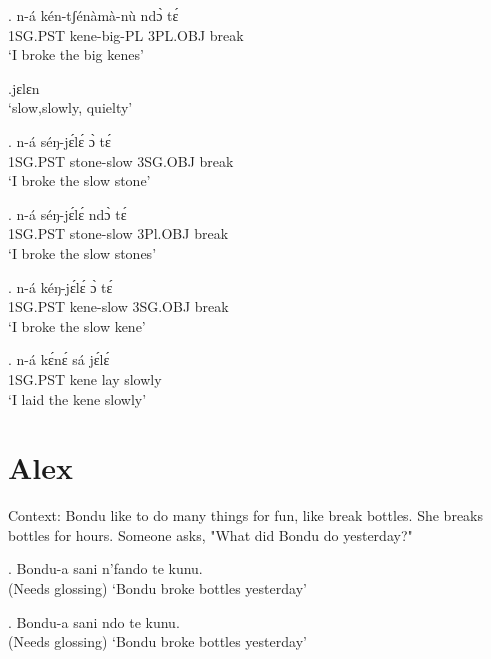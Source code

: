 \documentclass{assets/fieldnotes}
\begin{document}
{

\exg. n-á kén-tʃénàmà-nù ndɔ̀ tɛ́\\
1SG.PST kene-big-PL 3PL.OBJ break\\
`I broke the big kenes'


\jf{}

\ex.jɛlɛn\\
`slow,slowly, quielty' 


\exg. n-á séŋ-jɛ́lɛ́ ɔ̀ tɛ́\\
1SG.PST stone-slow 3SG.OBJ break\\
`I broke the slow stone'

\exg. n-á séŋ-jɛ́lɛ́ ndɔ̀ tɛ́\\
1SG.PST stone-slow 3Pl.OBJ break\\
`I broke the slow stones'

\exg. n-á kéŋ-jɛ́lɛ́ ɔ̀ tɛ́\\
1SG.PST kene-slow 3SG.OBJ break\\
`I broke the slow kene'


\exg. n-á kɛ́nɛ́ sá jɛ́lɛ́\\
1SG.PST kene lay slowly\\
`I laid the kene slowly'




\section{Alex}

\item[ Context: Bondu like to do many things for fun, like break bottles. She breaks bottles for hours. Someone asks, "What did Bondu do yesterday?"]

\exg. Bondu-a sani n'fando te kunu.\\
(Needs glossing)
`Bondu broke bottles yesterday'

\exg. Bondu-a sani ndo te kunu.\\
(Needs glossing)
`Bondu broke bottles yesterday'

}
\end{document}
